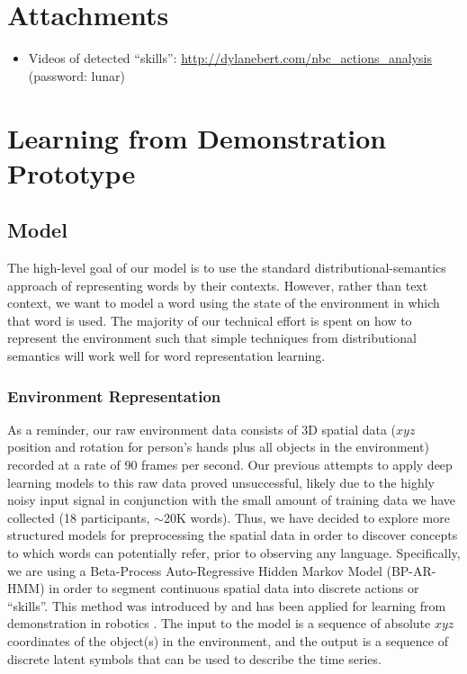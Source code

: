 \documentclass[11pt]{article}
\begin{document}
\section*{Attachments} 
\begin{itemize}
\item Videos of detected ``skills'': \url{http://dylanebert.com/nbc_actions_analysis} (password: lunar)
\end{itemize}

\newpage

\section{Learning from Demonstration Prototype} 
\label{sec:lfd}

\subsection{Model}

The high-level goal of our model is to use the standard distributional-semantics approach of representing words by their contexts. However, rather than text context, we want to model a word using the state of the environment in which that word is used. The majority of our technical effort is spent on how to represent the environment such that simple techniques from distributional semantics will work well for word representation learning. 

\subsubsection{Environment Representation}

As a reminder, our raw environment data consists of 3D spatial data ($xyz$ position and rotation for person's hands plus all objects in the environment) recorded at a rate of 90 frames per second. Our previous attempts to apply deep learning models to this raw data proved unsuccessful, likely due to the highly noisy input signal in conjunction with the small amount of training data we have collected (18 participants, $\sim$20K words). Thus, we have decided to explore more structured models for preprocessing the spatial data in order to discover concepts to which words can potentially refer, prior to observing any language. Specifically, we are using a Beta-Process Auto-Regressive Hidden Markov Model (BP-AR-HMM) in order to segment continuous spatial data into discrete actions or ``skills''. This method was introduced by \cite{fox2014joint} and has been applied for learning from demonstration in robotics \cite{konidaris2012robot}. The input to the model is a sequence of absolute $xyz$ coordinates of the object(s) in the environment, and the output is a sequence of discrete latent symbols that can be used to describe the time series. 
\end{document}
